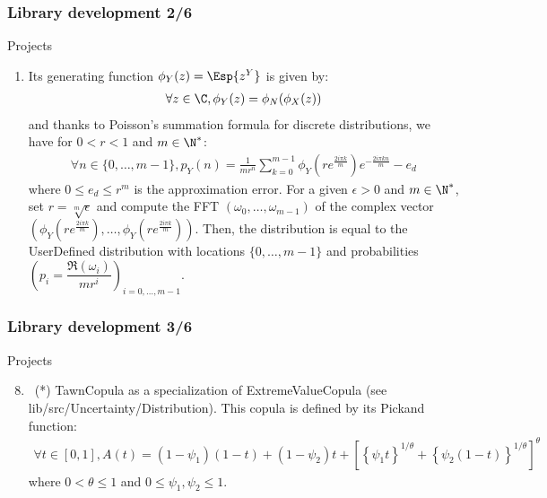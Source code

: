 \documentclass[8pt]{beamer}
\begin{document}
\begin{frame}
  \frametitle{Library development 2/6}
  \begin{block}{Projects}
    \begin{enumerate}
    \item[] Its generating function $\phi_Y(z)=\Esp{z^Y}$ is given by:
      \begin{align}
        \forall z\in\C, \phi_Y(z)=\phi_N(\phi_X(z))
      \end{align}
      and thanks to Poisson's summation formula for discrete distributions, we have for $0<r<1$ and $m\in\N^*$:
      \begin{eqnarray}\label{pnApprox}
        \forall n\in\{0,\dots, m-1\}, p_Y(n) = \displaystyle \frac{1}{mr^n} \sum_{k=0}^{m-1} \phi_Y\left(re^{\frac{2i\pi k}{m}}\right) e^{-\frac{2i\pi kn}{m}} - e_d
      \end{eqnarray}
      where $0\leq e_d\leq r^m$ is the approximation error. For a given $\epsilon>0$ and $m\in\N^*$, set $r=\sqrt[m]{\epsilon}$ and compute the FFT $(\omega_0,\dots,\omega_{m-1})$ of the complex vector $(\phi_Y\left(re^{\frac{2i\pi k}{m}}\right), \dots, \phi_Y\left(re^{\frac{2i\pi k}{m}}\right))$. Then, the distribution is equal to the {\ttfamily UserDefined} distribution with locations $\{0,\dots,m-1\}$ and probabilities $\left(p_i=\dfrac{\mathfrak{R}(\omega_i)}{mr^i}\right)_{i=0,\dots,m-1}$.
    \end{enumerate}
  \end{block}
\end{frame}

\begin{frame}
  \frametitle{Library development 3/6}
  \begin{block}{Projects}
    \begin{enumerate}
      \setcounter{enumi}{7}
    \item~(*) \alert{\ttfamily TawnCopula} as a specialization of {\ttfamily ExtremeValueCopula} (see {\ttfamily lib/src/Uncertainty/Distribution}). This copula is defined by its Pickand function:
      \begin{align}
        \forall t\in[0,1], A(t)=(1-\psi_1)(1-t)+(1-\psi_2)t+\left[\left\{\psi_1t\right\}^{1/\theta}+\left\{\psi_2(1-t)\right\}^{1/\theta}\right]^\theta
      \end{align}
      where $0<\theta\leq 1$ and $0\leq\psi_1,\psi_2\leq 1$.
    \end{enumerate}
  \end{block}
\end{frame}
\end{document}

